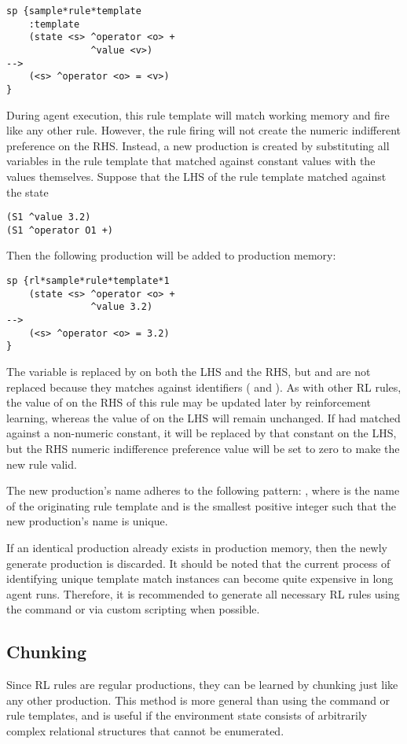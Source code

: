 \begin{verbatim}
sp {sample*rule*template
    :template
    (state <s> ^operator <o> +
               ^value <v>)
-->
    (<s> ^operator <o> = <v>)
}
\end{verbatim}

During agent execution, this rule template will match working memory and fire like any other rule.
However, the rule firing will not create the numeric indifferent preference on the RHS.
Instead, a new production is created by substituting all variables in the rule template that matched against constant values with the values themselves.
Suppose that the LHS of the rule template matched against the state

\begin{verbatim}
(S1 ^value 3.2)
(S1 ^operator O1 +)
\end{verbatim}

Then the following production will be added to production memory:

\begin{verbatim}
sp {rl*sample*rule*template*1
    (state <s> ^operator <o> +
               ^value 3.2)
-->
    (<s> ^operator <o> = 3.2)
}
\end{verbatim}

The variable  is replaced by  on both the LHS and the RHS, but  and  are not replaced because they matches against identifiers ( and ).
As with other RL rules, the value of  on the RHS of this rule may be updated later by reinforcement learning, whereas the value of  on the LHS will remain unchanged.
If  had matched against a non-numeric constant, it will be replaced by that constant on the LHS, but the RHS numeric indifference preference value will be set to zero to make the new rule valid.

The new production's name adheres to the following pattern:
, where  is the name of the originating rule template and  is the smallest positive integer such that the new production's name is unique.

If an identical production already exists in production memory, then the newly generate production is discarded.
It should be noted that the current process of identifying unique template match instances can become quite expensive in long agent runs.
Therefore, it is recommended to generate all necessary RL rules using the  command or via custom scripting when possible.

\subsection{Chunking}
Since RL rules are regular productions, they can be learned by chunking just like any other production.
This method is more general than using the  command or rule templates, and is useful if the environment state consists of arbitrarily complex relational structures that cannot be enumerated.
